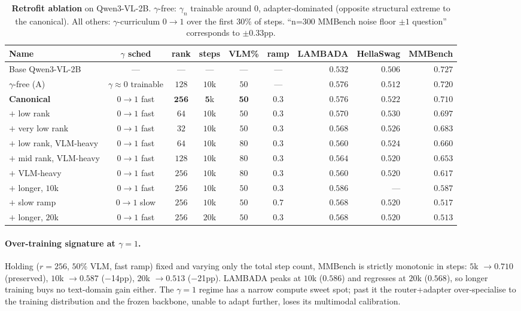 \documentclass{article}
\begin{document}
\begin{table}[h]
\caption{\textbf{Retrofit ablation} on Qwen3-VL-2B. $\gamma$-free: $\gamma_n$ trainable around $0$, adapter-dominated (opposite structural extreme to the canonical). All others: $\gamma$-curriculum $0{\to}1$ over the first $30\%$ of steps. ``n=300 MMBench noise floor $\pm 1$ question'' corresponds to $\pm 0.33$pp.}
\label{tab:retrofit_ablation}
\centering\small
\begin{tabular}{lcccccrrr}
\toprule
Name & $\gamma$ sched & rank & steps & VLM\% & ramp & LAMBADA & HellaSwag & MMBench \\
\midrule
Base Qwen3-VL-2B & --- & --- & --- & --- & --- & $0.532$ & $0.506$ & $0.727$ \\
$\gamma$-free (A) & $\gamma{\approx}0$ trainable & $128$ & $10$k & $50$ & --- & $0.576$ & $0.512$ & $0.720$ \\
\midrule
\textbf{Canonical} & $0{\to}1$ fast & $\mathbf{256}$ & $\mathbf{5}$k & $\mathbf{50}$ & $\mathbf{0.3}$ & $\mathbf{0.576}$ & $\mathbf{0.522}$ & $\mathbf{0.710}$ \\
$+$ low rank      & $0{\to}1$ fast & $64$  & $10$k & $50$ & $0.3$ & $0.570$ & $0.530$ & $0.697$ \\
$+$ very low rank & $0{\to}1$ fast & $32$  & $10$k & $50$ & $0.3$ & $0.568$ & $0.526$ & $0.683$ \\
$+$ low rank, VLM-heavy & $0{\to}1$ fast & $64$  & $10$k & $80$ & $0.3$ & $0.560$ & $0.524$ & $0.660$ \\
$+$ mid rank, VLM-heavy & $0{\to}1$ fast & $128$ & $10$k & $80$ & $0.3$ & $0.564$ & $0.520$ & $0.653$ \\
$+$ VLM-heavy     & $0{\to}1$ fast & $256$ & $10$k & $80$ & $0.3$ & $0.560$ & $0.520$ & $0.617$ \\
$+$ longer, $10$k & $0{\to}1$ fast & $256$ & $10$k & $50$ & $0.3$ & $0.586$ & ---     & $0.587$ \\
$+$ slow ramp     & $0{\to}1$ slow & $256$ & $10$k & $50$ & $0.7$ & $0.568$ & $0.520$ & $0.517$ \\
$+$ longer, $20$k & $0{\to}1$ fast & $256$ & $20$k & $50$ & $0.3$ & $0.568$ & $0.520$ & $0.513$ \\
\bottomrule
\end{tabular}
\end{table}

\paragraph{Over-training signature at $\gamma{=}1$.} Holding ($r{=}256$, $50\%$ VLM, fast ramp) fixed and varying only the total step count, MMBench is strictly monotonic in steps: $5$k $\to 0.710$ (preserved), $10$k $\to 0.587$ ($-$14pp), $20$k $\to 0.513$ ($-$21pp). LAMBADA peaks at $10$k ($0.586$) and regresses at $20$k ($0.568$), so longer training buys no text-domain gain either. The $\gamma{=}1$ regime has a narrow compute sweet spot; past it the router+adapter over-specialise to the training distribution and the frozen backbone, unable to adapt further, loses its multimodal calibration.
\end{document}
